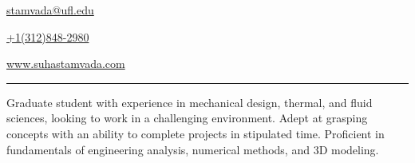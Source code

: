 \documentclass[11pt, letterpaper]{article}
\begin{document}
\begin{flushleft}
{\href{mailto:stamvada@ufl.edu}{stamvada@ufl.edu}}\hfill {} \hfill \raggedright{\href{tel:3128482980}{+1(312)848-2980}}
\end{flushleft}
\begin{flushleft}
{\href{https://www.suhastamvada.com}{www.suhastamvada.com}} \hfill {} \hfill \raggedright{\href{https://www.linkedin.com/in/suhastamvada/}{}}
\end{flushleft}
\vspace{-8pt}
\noindent \rule[2pt]{\textwidth}{0.5pt} %
Graduate student with experience in mechanical design, thermal, and fluid sciences, looking to work in a challenging environment. Adept at grasping concepts with an ability to complete projects in stipulated time. Proficient in fundamentals of engineering analysis, numerical methods, and 3D modeling. %
\end{document}
